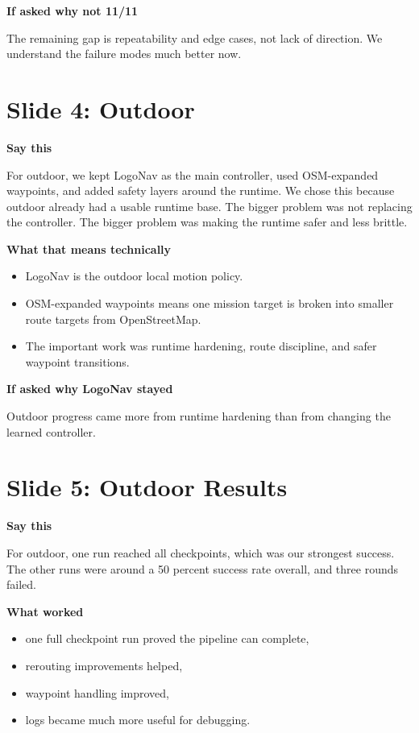 \documentclass[11pt]{article}
\begin{document}
\textbf{If asked why not 11/11}

The remaining gap is repeatability and edge cases, not lack of direction. We understand the failure modes much better now.

\section*{Slide 4: Outdoor}
\textbf{Say this}

For outdoor, we kept LogoNav as the main controller, used OSM-expanded waypoints, and added safety layers around the runtime. We chose this because outdoor already had a usable runtime base. The bigger problem was not replacing the controller. The bigger problem was making the runtime safer and less brittle.

\textbf{What that means technically}
\begin{itemize}[leftmargin=*]
\item LogoNav is the outdoor local motion policy.
\item OSM-expanded waypoints means one mission target is broken into smaller route targets from OpenStreetMap.
\item The important work was runtime hardening, route discipline, and safer waypoint transitions.
\end{itemize}

\textbf{If asked why LogoNav stayed}

Outdoor progress came more from runtime hardening than from changing the learned controller.

\section*{Slide 5: Outdoor Results}
\textbf{Say this}

For outdoor, one run reached all checkpoints, which was our strongest success. The other runs were around a 50 percent success rate overall, and three rounds failed.

\textbf{What worked}
\begin{itemize}[leftmargin=*]
\item one full checkpoint run proved the pipeline can complete,
\item rerouting improvements helped,
\item waypoint handling improved,
\item logs became much more useful for debugging.
\end{itemize}
\end{document}
